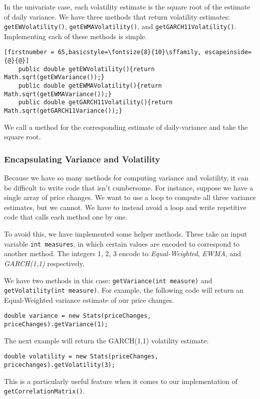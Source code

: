 \documentclass[../Dissertation.tex]{subfiles}
\begin{document}
In the univariate case, each volatility estimate is the square root of the estimate of daily variance.
We have three methods that return volatility estimates: \lstinline|getEWVolatility()|, \lstinline|getEWMAVolatility()|, and \lstinline|getGARCH11Volatility()|.
Implementing each of these methods is simple.
\begin{lstlisting}[firstnumber = 65,basicstyle=\fontsize{8}{10}\sffamily, escapeinside={@}{@}]
    public double getEWVolatility(){return Math.sqrt(getEWVariance());}
    public double getEWMAVolatility(){return Math.sqrt(getEWMAVariance());}
    public double getGARCH11Volatility(){return Math.sqrt(getGARCH11Variance());}
\end{lstlisting}
We call a method for the corresponding estimate of daily-variance and take the square root.

\subsubsection{Encapsulating Variance and Volatility}

Because we have so many methods for computing variance and volatility, it can be difficult to write code that isn't cumbersome.
For instance, suppose we have a single array of price changes.
We want to use a loop to compute all three variance estimates, but we cannot.
We have to instead avoid a loop and write repetitive code that calls each method one by one.

To avoid this, we have implemented some helper methods.
These take an input variable \lstinline|int measures|, in which certain values are encoded to correspond to another method.
The integers 1, 2, 3 encode to \textit{Equal-Weighted}, \textit{EWMA},  and  \textit{GARCH(1,1)} respectively.

We have two methods in this case: \lstinline|getVariance(int measure)| and \lstinline|getVolatility(int measure)|.
For example, the following code will return an Equal-Weighted variance estimate of our price changes.
\begin{center}
	\lstinline|double variance = new Stats(priceChanges, priceChanges).getVariance(1);|
\end{center}
The next example will return the GARCH(1,1) volatility estimate:
\begin{center}
	\lstinline|double volatility = new Stats(priceChanges, pricechanges).getVolatility(3);|
\end{center}	
This is a particularly useful feature when it comes to our implementation of \lstinline|getCorrelationMatrix()|.
\end{document}
